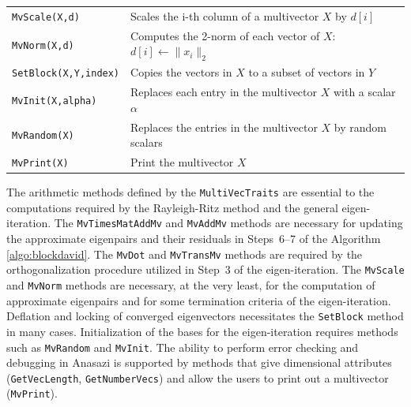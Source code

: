 \documentclass[acmtoms,acmnow]{acmtrans2m}
\newcommand{\aspace}[1]{\texttt{#1}}
\begin{document}
\begin{table}
\begin{center}
\begin{tabular}{| p{4cm} | p{8cm} |}
{\tt MvScale(X,d)}    & Scales the i-th column of a multivector $X$ by $d[i]$ \\

{\tt MvNorm(X,d)}     & Computes the 2-norm of each vector of
$X$: $d[i] \leftarrow \|x_i\|_2$  \\\hline

{\tt SetBlock(X,Y,index)} & Copies the vectors in $X$ to a subset of vectors in
$Y$ \\

{\tt MvInit(X,alpha)} & Replaces each entry in the multivector $X$ with a scalar $\alpha$  \\

{\tt MvRandom(X)} & Replaces the entries in the multivector $X$ by random
scalars \\\hline

{\tt MvPrint(X)} & Print the multivector $X$ \\

\hline
\end{tabular}
\end{center}
\end{table}


The arithmetic methods defined by the \aspace{MultiVecTraits} are essential to the
computations required by the Rayleigh-Ritz method and the general eigen-iteration.  The
\aspace{MvTimesMatAddMv} and \aspace{MvAddMv} methods are necessary for updating the
approximate eigenpairs and their residuals in Steps~6--7 of the Algorithm
\ref{algo:blockdavid}.  The \aspace{MvDot} and \aspace{MvTransMv} methods are required by
the orthogonalization procedure utilized in Step~3 of the eigen-iteration.  The
\aspace{MvScale} and \aspace{MvNorm} methods are necessary, at the very least, for the
computation of approximate eigenpairs and for some termination criteria of the
eigen-iteration.  Deflation and locking of converged eigenvectors necessitates the
\aspace{SetBlock} method in many cases.  Initialization of the bases for the
eigen-iteration requires methods such as \aspace{MvRandom} and \aspace{MvInit}.  The
ability to perform error checking and debugging in Anasazi is supported by methods that
give dimensional attributes (\aspace{GetVecLength}, \aspace{GetNumberVecs}) and allow the
users to print out a multivector (\aspace{MvPrint}). 
\end{document}
